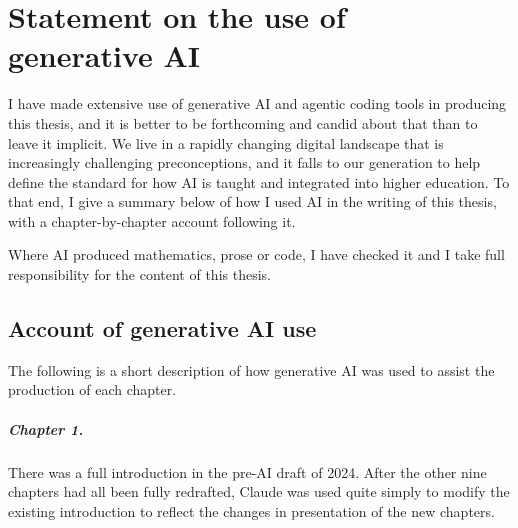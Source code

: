 %

\chapter*{Statement on the use of\texorpdfstring{\\}{ }generative AI}
\label{sup:ai-use}
\begingroup
{}

I have made extensive use of generative AI and agentic coding tools in producing this thesis, and it is better to be forthcoming and candid about that than to leave it implicit. We live in a rapidly changing digital landscape that is increasingly challenging preconceptions, and it falls to our generation to help define the standard for how AI is taught and integrated into higher education. To that end, I give a summary below of how I used AI in the writing of this thesis, with a chapter-by-chapter account following it.

Where AI produced mathematics, prose or code, I have checked it and I take full responsibility for the content of this thesis.

\section*{Account of generative AI use}
\label{sup:ai-account}

The following is a short description of how generative AI was used to assist the production of each chapter.

\paragraph{Chapter 1.}
There was a full introduction in the pre-AI draft of 2024. After the other nine chapters had all been fully redrafted, Claude was used quite simply to modify the existing introduction to reflect the changes in presentation of the new chapters.

